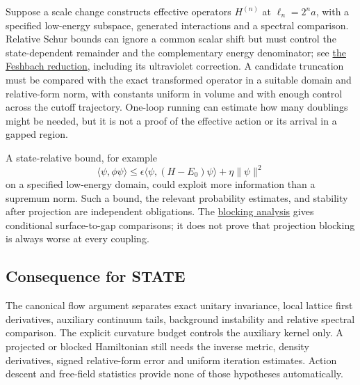 \documentclass[11pt,a4paper]{article}
\begin{document}
Suppose a scale change constructs effective operators \(H^{(n)}\) at
\(\ell_n=2^na\), with a specified low-energy subspace, generated
interactions and a spectral comparison. Relative Schur bounds can ignore
a common scalar shift but must control the state-dependent remainder and
the complementary energy denominator; see
\href{weak-coupling-feshbach-reduction.md}{the Feshbach reduction},
including its ultraviolet correction. A candidate truncation must be
compared with the exact transformed operator in a suitable domain and
relative-form norm, with constants uniform in volume and with enough
control across the cutoff trajectory. One-loop running can estimate how
many doublings might be needed, but it is not a proof of the effective
action or its arrival in a gapped region.

A state-relative bound, for example
\[\langle\psi,\phi\psi\rangle\le\epsilon\langle\psi,(H-E_0)\psi\rangle
 +\eta\|\psi\|^2\] on a specified low-energy domain, could exploit more
information than a supremum norm. Such a bound, the relevant probability
estimates, and stability after projection are independent obligations.
The \href{blocking-criterion-monotone.md}{blocking analysis} gives
conditional surface-to-gap comparisons; it does not prove that
projection blocking is always worse at every coupling.

\hypertarget{consequence-for-state}{%
\subsection{Consequence for STATE}\label{consequence-for-state}}

The canonical flow argument separates exact unitary invariance, local
lattice first derivatives, auxiliary continuum tails, background
instability and relative spectral comparison. The explicit curvature
budget controls the auxiliary kernel only. A projected or blocked
Hamiltonian still needs the inverse metric, density derivatives, signed
relative-form error and uniform iteration estimates. Action descent and
free-field statistics provide none of those hypotheses automatically.
\end{document}

